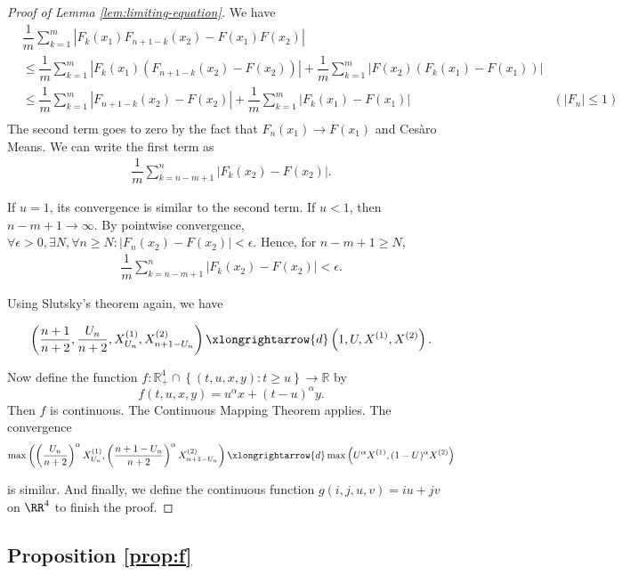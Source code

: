 \begin{proof}[Proof of Lemma \ref{lem:limiting-equation}]
  We have
  \begin{align*}
     & \dfrac{1}{m}\sum_{k=1}^{m} \left|F_k(x_1)F_{n+1-k}(x_2)-F(x_1) F(x_2)\right|                                                                                                       \\
     & \le \dfrac{1}{m}\sum_{k=1}^{m} \left|F_k(x_1)\left(F_{n+1-k}(x_2)-F(x_2)\right)\right| + \dfrac{1}{m}\sum_{k=1}^{m} \left|F(x_2)\left(F_k(x_1)-F(x_1)\right)\right|                \\
     & \le \dfrac{1}{m}\sum_{k=1}^{m} \left|F_{n+1-k}(x_2)-F(x_2)\right| + \dfrac{1}{m}\sum_{k=1}^{m} \left|F_k(x_1)-F(x_1)\right|                                         & (|F_n|\le 1) \\
  \end{align*}
  The second term goes to zero by the fact that $F_n(x_1)\to F(x_1)$ and Cesàro Means. We can write the first term as
  \begin{align*}
    \dfrac{1}{m}\sum_{k=n-m+1}^{n} \left|F_{k}(x_2)-F(x_2)\right|.
  \end{align*}

  If $u=1$, its convergence is similar to the second term. If $u<1$, then $n-m+1 \to \infty$. By pointwise convergence, $\forall \epsilon>0, \exists N, \forall n\ge N: |F_n(x_2)-F(x_2)|<\epsilon$. Hence, for $n-m+1\ge N$,
  \begin{align*}
    \dfrac{1}{m}\sum_{k=n-m+1}^{n} \left|F_{k}(x_2)-F(x_2)\right| < \epsilon.
  \end{align*}

  Using Slutsky's theorem again, we have

  $$\left(\dfrac{n+1}{n+2}, \dfrac{U_n}{n+2}, X_{U_n}^{(1)}, X_{n+1-U_n}^{(2)}\right) \xlongrightarrow{d} \left(1, U, X^{(1)}, X^{(2)}\right).$$

  Now define the function $f:\mathbb{R}^4_+\cap \left\{(t,u,x,y): t\ge u\right\} \to \mathbb{R}$ by
  $$f(t,u,x,y) = u^\alpha x + (t-u)^\alpha y.$$
  Then $f$ is continuous. The Continuous Mapping Theorem applies. The convergence
  $$\max\left(\left(\dfrac{U_n}{n+2}\right)^\alpha X_{U_n}^{(1)}, \left(\dfrac{n+1-U_n}{n+2}\right)^\alpha X_{n+1-U_n}^{(2)}\right) \xlongrightarrow{d} \max\left(U^\alpha X^{(1)}, (1-U)^\alpha X^{(2)}\right)$$

  is similar. And finally, we define the continuous function $g(i,j,u,v) = iu+jv$ on $\RR^4$ to finish the proof.
\end{proof}


\subsection{Proposition \ref{prop:f}}
\label{subsec:proof-prop-f}

